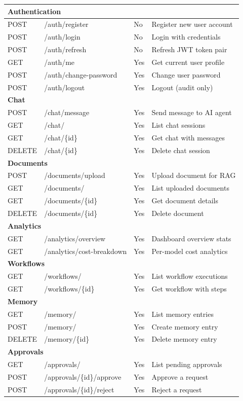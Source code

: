 \documentclass[12pt, a4paper]{report}
\begin{document}
\begin{longtable}{p{1.2cm}|p{4.5cm}|p{0.8cm}|p{5cm}}
\multicolumn{4}{l}{\textbf{Authentication}} \\
\midrule
POST & /auth/register & No  & Register new user account \\
POST & /auth/login    & No  & Login with credentials \\
POST & /auth/refresh  & No  & Refresh JWT token pair \\
GET  & /auth/me       & Yes & Get current user profile \\
POST & /auth/change-password & Yes & Change user password \\
POST & /auth/logout   & Yes & Logout (audit only) \\
\midrule
\multicolumn{4}{l}{\textbf{Chat}} \\
\midrule
POST   & /chat/message     & Yes & Send message to AI agent \\
GET    & /chat/            & Yes & List chat sessions \\
GET    & /chat/\{id\}      & Yes & Get chat with messages \\
DELETE & /chat/\{id\}      & Yes & Delete chat session \\
\midrule
\multicolumn{4}{l}{\textbf{Documents}} \\
\midrule
POST   & /documents/upload  & Yes & Upload document for RAG \\
GET    & /documents/        & Yes & List uploaded documents \\
GET    & /documents/\{id\}  & Yes & Get document details \\
DELETE & /documents/\{id\}  & Yes & Delete document \\
\midrule
\multicolumn{4}{l}{\textbf{Analytics}} \\
\midrule
GET & /analytics/overview       & Yes & Dashboard overview stats \\
GET & /analytics/cost-breakdown & Yes & Per-model cost analytics \\
\midrule
\multicolumn{4}{l}{\textbf{Workflows}} \\
\midrule
GET & /workflows/       & Yes & List workflow executions \\
GET & /workflows/\{id\} & Yes & Get workflow with steps \\
\midrule
\multicolumn{4}{l}{\textbf{Memory}} \\
\midrule
GET    & /memory/       & Yes & List memory entries \\
POST   & /memory/       & Yes & Create memory entry \\
DELETE & /memory/\{id\} & Yes & Delete memory entry \\
\midrule
\multicolumn{4}{l}{\textbf{Approvals}} \\
\midrule
GET  & /approvals/              & Yes & List pending approvals \\
POST & /approvals/\{id\}/approve & Yes & Approve a request \\
POST & /approvals/\{id\}/reject  & Yes & Reject a request \\

\end{longtable}
\normalsize
\end{document}
